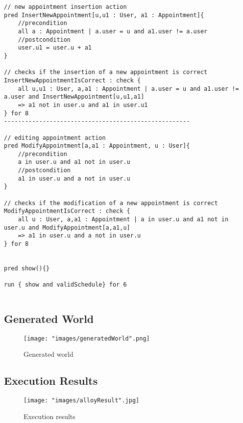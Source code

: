 \begin{lstlisting}
// new appointment insertion action
pred InsertNewAppointment[u,u1 : User, a1 : Appointment]{
	//precondition
	all a : Appointment | a.user = u and a1.user != a.user
	//postcondition
	user.u1 = user.u + a1
}

// checks if the insertion of a new appointment is correct
InsertNewAppointmentIsCorrect : check {
	all u,u1 : User, a,a1 : Appointment | a.user = u and a1.user != a.user and InsertNewAppointment[u,u1,a1] 
	=> a1 not in user.u and a1 in user.u1
} for 8
-----------------------------------------------------

// editing appointment action
pred ModifyAppointment[a,a1 : Appointment, u : User]{
	//precondition
	a in user.u and a1 not in user.u
	//postcondition
	a1 in user.u and a not in user.u
}

// checks if the modification of a new appointment is correct
ModifyAppointmentIsCorrect : check {
	all u : User, a,a1 : Appointment | a in user.u and a1 not in user.u and ModifyAppointment[a,a1,u]
	=> a1 in user.u and a not in user.u
} for 8


pred show(){}

run { show and validSchedule} for 6


\end{lstlisting}

\subsection{Generated World}
\begin{figure}[H]
\begin{center}
\texttt{[image: "images/generatedWorld".png]}
\caption{Generated world}
\end{center}
\end{figure}


\subsection{Execution Results}
\begin{figure}[H]
\begin{center}
\texttt{[image: "images/alloyResult".jpg]}
\caption{Execution results}
\end{center}
\end{figure}


